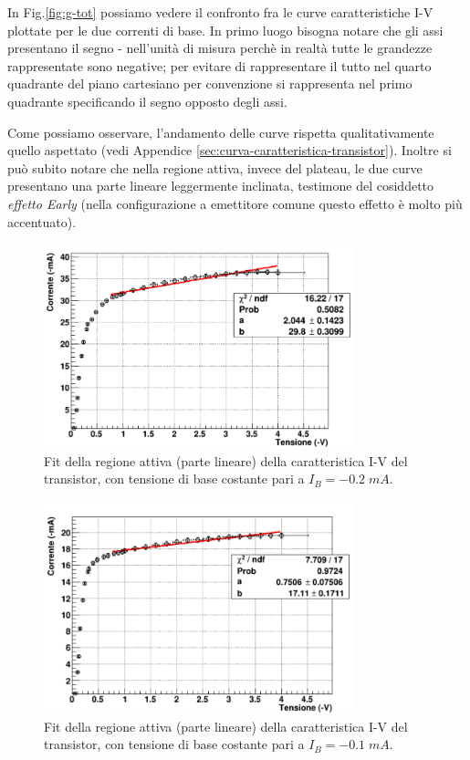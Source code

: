 \documentclass[a4paper, 11pt]{article}
\begin{document}
\newpage
In Fig.\ref{fig:g-tot} possiamo vedere il confronto fra le curve caratteristiche I-V plottate per le due correnti di base. In primo luogo bisogna notare che gli assi presentano il segno - nell'unità di misura perchè in realtà tutte le grandezze rappresentate sono negative; per evitare di rappresentare il tutto nel quarto quadrante del piano cartesiano per convenzione si rappresenta nel primo quadrante specificando il segno opposto degli assi. 

Come possiamo osservare, l'andamento delle curve rispetta qualitativamente quello aspettato (vedi Appendice \ref{sec:curva-caratteristica-transistor}). Inoltre si può subito notare che nella regione attiva, invece del plateau, le due curve presentano una parte lineare leggermente inclinata, testimone del cosiddetto \textit{effetto Early} (nella configurazione a emettitore comune questo effetto è molto più accentuato). 

\begin{figure}[!htb]
    \centering
    \includegraphics[width=0.8\textwidth]{Immagini - Seconda prova/Fit-200.png}
    \caption{Fit della regione attiva (parte lineare) della caratteristica I-V del transistor, con tensione di base costante pari a $I_B = -0.2 \;mA $.}
    \label{fig:fit-200}
\end{figure}

\begin{figure}[!htb]
    \centering
    \includegraphics[width=0.8\textwidth]{Immagini - Seconda prova/Fit-100.png}
    \caption{Fit della regione attiva (parte lineare) della caratteristica I-V del transistor, con tensione di base costante pari a $I_B = -0.1 \;mA $.}
    \label{fig:fit-100}
\end{figure}
\end{document}
